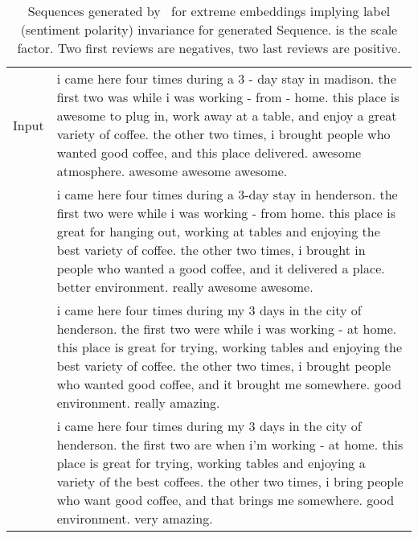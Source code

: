 \begin{table}[ht]
{\begin{tabular}[t]{c|p{16cm}}
\small Input	&i came here four times during a 3 - day stay in madison. the first two was while i was working - from - home. this place is awesome to plug in, work away at a table, and enjoy a great variety of coffee. the other two times, i brought people who wanted good coffee, and this place delivered. awesome atmosphere. awesome awesome awesome. \\
\small 	&i came here four times during a 3-day stay in henderson. the first two were while i was working - from home. this place is great for hanging out, working at tables and enjoying the best variety of coffee. the other two times, i brought in people who wanted a good coffee, and it delivered a place. better environment. really awesome awesome. \\
\small 	&i came here four times during my 3 days in the city of henderson. the first two were while i was working - at home. this place is great for trying, working tables and enjoying the best variety of coffee. the other two times, i brought people who wanted good coffee, and it brought me somewhere. good environment. really amazing. \\
\small 	&i came here four times during my 3 days in the city of henderson. the first two are when i'm working - at home. this place is great for trying, working tables and enjoying a variety of the best coffees. the other two times, i bring people who want good coffee, and that brings me somewhere. good environment. very amazing.\\\hline
\end{tabular}}
\caption{Sequences generated by \geneliex\ for extreme embeddings implying label (sentiment polarity) invariance for generated Sequence.  is the scale factor. Two first reviews are negatives, two last reviews are positive.}
\label{tab:additional_example_sentences}
\end{table}



